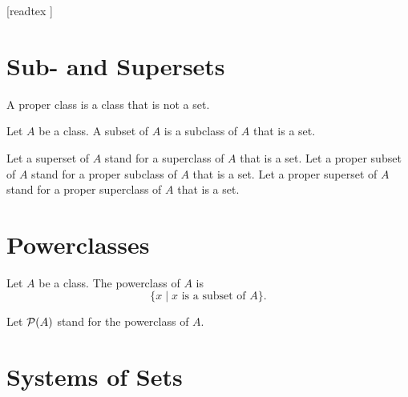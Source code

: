 \documentclass[10pt]{article}
\begin{document}
  \begin{imports}
    \begin{forthel}

      [readtex ]

    \end{forthel}
  \end{imports}


  \section{Sub- and Supersets}

  \begin{forthel}
    \begin{definition}
      A proper class is a class that is not a set.
    \end{definition}
  \end{forthel}

  \begin{forthel}
    \begin{definition}
      Let $A$ be a class.
      A subset of $A$ is a subclass of $A$ that is a set.
    \end{definition}

    Let a superset of $A$ stand for a superclass of $A$ that is a set.
    Let a proper subset of $A$ stand for a proper subclass of $A$ that is a set.
    Let a proper superset of $A$ stand for a proper superclass of $A$ that is a
    set.
  \end{forthel}


  \section{Powerclasses}

  \begin{forthel}
    \begin{definition}
      Let $A$ be a class.
      The powerclass of $A$ is
      \[ \{ x \mid \text{$x$ is a subset of $A$} \}. \]
    \end{definition}

    Let $\mathcal{P}(A)$ stand for the powerclass of $A$.
  \end{forthel}


  \section{Systems of Sets}
\end{document}
